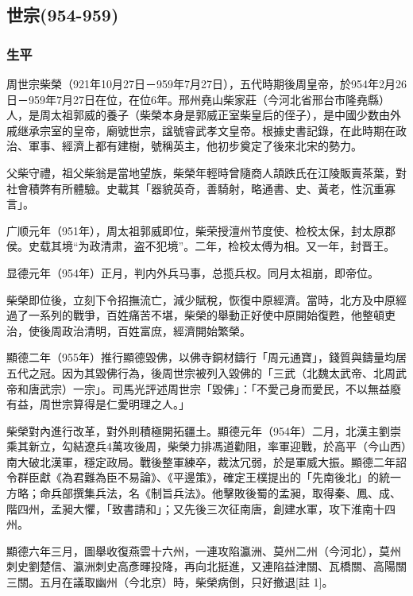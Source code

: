 
\subsection{世宗\tiny(954-959)}

\subsubsection{生平}

周世宗柴榮（921年10月27日－959年7月27日），五代時期後周皇帝，於954年2月26日－959年7月27日在位，在位6年。邢州堯山柴家莊（今河北省邢台市隆堯縣）人，是周太祖郭威的養子（柴榮本身是郭威正室柴皇后的侄子），是中國少数由外戚继承宗室的皇帝，廟號世宗，諡號睿武孝文皇帝。根據史書記錄，在此時期在政治、軍事、經濟上都有建樹，號稱英主，他初步奠定了後來北宋的勢力。

父柴守禮，祖父柴翁是當地望族，柴榮年輕時曾隨商人頡跌氏在江陵販賣茶葉，對社會積弊有所體驗。史載其「器貌英奇，善騎射，略通書、史、黃老，性沉重寡言」。

广顺元年（951年），周太祖郭威即位，柴荣授澶州节度使、检校太保，封太原郡侯。史载其境“为政清肃，盗不犯境”。二年，检校太傅为相。又一年，封晋王。

显德元年（954年）正月，判内外兵马事，总揽兵权。同月太祖崩，即帝位。

柴榮即位後，立刻下令招撫流亡，減少賦稅，恢復中原經濟。當時，北方及中原經過了一系列的戰爭，百姓痛苦不堪，柴榮的舉動正好使中原開始復甦，他整頓吏治，使後周政治清明，百姓富庶，經濟開始繁榮。

顯德二年（955年）推行顯德毀佛，以佛寺銅材鑄行「周元通寶」，錢質與鑄量均居五代之冠。因为其毀佛行為，後周世宗被列入毀佛的「三武（北魏太武帝、北周武帝和唐武宗）一宗」。司馬光評述周世宗「毀佛」：「不愛己身而愛民，不以無益廢有益，周世宗算得是仁愛明理之人。」

柴榮對內進行改革，對外則積極開拓疆土。顯德元年（954年）二月，北漢主劉崇乘其新立，勾結遼兵4萬攻後周，柴榮力排馮道勸阻，率軍迎戰，於高平（今山西）南大破北漢軍，穩定政局。戰後整軍練卒，裁汰冗弱，於是軍威大振。顯德二年詔令群臣獻《為君難為臣不易論》、《平邊策》，確定王樸提出的「先南後北」的統一方略；命兵部撰集兵法，名《制旨兵法》。他擊敗後蜀的孟昶，取得秦、鳳、成、階四州，孟昶大懼，「致書請和」；又先後三次征南唐，創建水軍，攻下淮南十四州。

顯德六年三月，圖舉收復燕雲十六州，一連攻陷瀛洲、莫州二州（今河北），莫州刺史劉楚信、瀛洲刺史高彥暉投降，再向北挺進，又連陷益津關、瓦橋關、高陽關三關。五月在議取幽州（今北京）時，柴榮病倒，只好撤退[註 1]。

